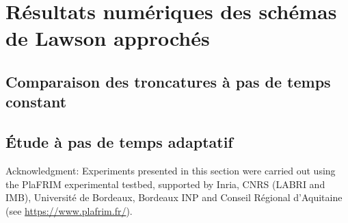 
\section{Résultats numériques des schémas de Lawson approchés}

\subsection{Comparaison des troncatures à pas de temps constant}

\subsection{Étude à pas de temps adaptatif}

\begin{otherlanguage}{english}
Acknowledgment: Experiments presented in this section were carried out using the PlaFRIM experimental testbed, supported by Inria, CNRS (LABRI and IMB), Université de Bordeaux, Bordeaux INP and Conseil Régional d’Aquitaine (see \url{https://www.plafrim.fr/}).
\end{otherlanguage}
